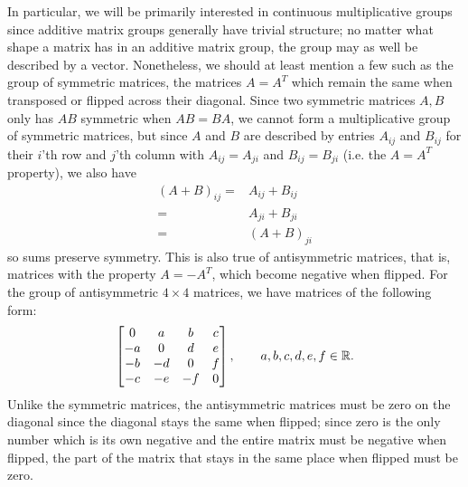 \documentclass[11pt]{article}
\begin{document}
In particular, we will be primarily interested in continuous multiplicative groups since additive matrix groups generally have trivial structure; no matter what shape a matrix has in an additive matrix group, the group may as well be described by a vector. Nonetheless, we should at least mention a few such as the group of symmetric matrices, the matrices $A = A^T$ which remain the same when transposed or flipped across their diagonal. Since two symmetric matrices $A,B$ only has $AB$ symmetric when $AB=BA$, we cannot form a multiplicative group of symmetric matrices, but since $A$ and $B$ are described by entries $A_{ij}$ and $B_{ij}$ for their $i$'th row and $j$'th column with $A_{ij}=A_{ji}$ and $B_{ij}=B_{ji}$ (i.e. the $A=A^T$ property), we also have \begin{align*}
(A+B)_{ij} =& A_{ij} + B_{ij} \\
=& A_{ji} + B_{ji} \\
=& (A+B)_{ji}
\end{align*}
so sums preserve symmetry. This is also true of antisymmetric matrices, that is, matrices with the property $A = -A^T$, which become negative when flipped. For the group of antisymmetric $4\times 4$ matrices, we have matrices of the following form: \begin{gather*}
\begin{bmatrix}
0 & a & b & c \\ -a & 0 & d & e \\ -b & -d & 0 & f \\ -c & -e & -f & 0
\end{bmatrix}, \hspace{2em} a,b,c,d,e,f \in \mathbb{R}.
\end{gather*} 
Unlike the symmetric matrices, the antisymmetric matrices must be zero on the diagonal since the diagonal stays the same when flipped; since zero is the only number which is its own negative and the entire matrix must be negative when flipped, the part of the matrix that stays in the same place when flipped must be zero.
\end{document}
